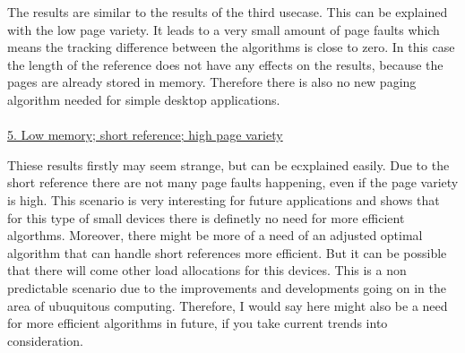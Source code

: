 \documentclass[12pt, reqno]{amsart}
\numberwithin{equation}{section}
\begin{document}
The results are similar to the results of the third usecase. This can be explained with the low page variety. It leads to a very small amount 
of page faults which means the tracking difference between the algorithms is close to zero. In this case the length of the reference does not have any effects 
on the results, because the pages are already stored in memory. Therefore there is also no new paging algorithm needed for simple desktop applications. \\ \\

\underline{5. Low memory; short reference; high page variety} \\
\begin{center}
\end{center}

Thiese results firstly may seem strange, but can be ecxplained easily. Due to the short reference there are not many page faults happening, even if the 
page variety is high. This scenario is very interesting for future applications and shows that for this type of small devices there is definetly no need for more 
efficient algorthms. Moreover, there might be more of a need of an adjusted optimal algorithm that can handle short references more efficient. But it can be possible that
there will come other load allocations for this devices. This is a non predictable scenario due to the improvements and developments going on in the area of ubuquitous computing. Therefore,
I would say here might also be a need for more efficient algorithms in future, if you take current trends into consideration. \\ \\
\end{document}
